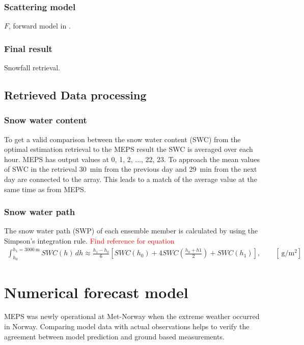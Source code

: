 \subsection*{Scattering model}
$F$, forward model in .
\subsection*{Final result}
Snowfall retrieval.

\section{Retrieved Data processing}
\subsection*{Snow water content}
To get a valid comparison between the snow water content (SWC) from the optimal estimation retrieval to the MEPS result the SWC is averaged over each hour. MEPS has output values at \SI{0}{}, \SI{1}{}, \SI{2}{}, ..., \SI{22}{}, \SI{23}{\UTC}. To approach the mean values of SWC in the retrieval \SI{30}{\minute} from the previous day and \SI{29}{\minute} from the next day are connected to the array. This leads to a match of the average value at the same time as from MEPS.


\subsection*{Snow water path}
The snow water path (SWP) of each ensemble member is calculated by using the Simpson's integration rule.  \textcolor{red}{Find reference for equation}
\begin{align}
	\int_{h_0}^{h_1=\SI{3000}{\metre}} SWC(h) \, dh \approx \frac{h_1 - h_0}{6} \left[SWC(h_0) + 4SWC\left(\frac{h_0 + h1}{2}\right) + SWC(h_1) \right], \qquad [\SI{}{\g\per\square\meter}]
	\label{eq:SWP}
\end{align}

\chapter{Numerical forecast model}
MEPS was newly operational at Met-Norway when the extreme weather occurred in Norway. Comparing model data with actual observations helps to verify the agreement between model prediction and ground based measurements. 

